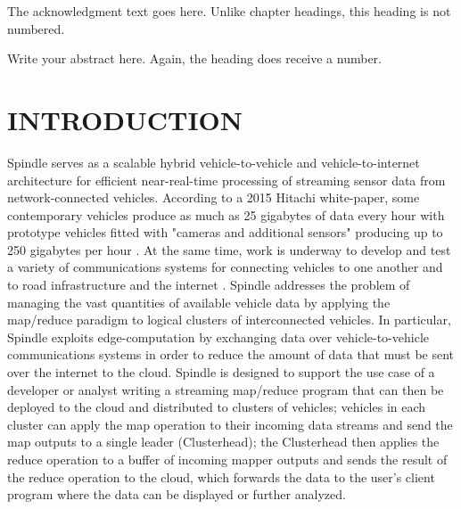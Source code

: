 \documentclass{thesis}
\author{William Rory Kronmiller}
\begin{document}
 
\titlepage             %
\tableofcontents       %
\listoftables          %
\listoffigures         %

The acknowledgment text goes here. Unlike chapter headings, 
this heading is not numbered.

Write your abstract here. Again, the heading does receive a number.

\chapter{INTRODUCTION}
    Spindle serves as a scalable hybrid vehicle-to-vehicle and vehicle-to-internet architecture
    for efficient near-real-time processing of streaming sensor data from network-connected vehicles.
    According to a 2015 Hitachi white-paper, some contemporary vehicles produce as much
    as 25 gigabytes of data every hour with prototype vehicles fitted with "cameras and additional
    sensors" producing up to 250 gigabytes per hour \cite{hitachi}. At the same time, work is underway
    to develop and test a variety of communications systems for connecting vehicles to one another
    and to road infrastructure and the internet \cite{connectivitypaper}. Spindle addresses the problem
    of managing the vast quantities of available vehicle data by applying the map/reduce \cite{mapreduce}
    paradigm to logical clusters of interconnected vehicles. In particular, Spindle exploits edge-computation
    by exchanging data over vehicle-to-vehicle communications systems in order to reduce the amount of data
    that must be sent over the internet to the cloud. Spindle is designed to support the use case
    of a developer or analyst writing a streaming map/reduce program that can then be deployed to the cloud
    and distributed to clusters of vehicles; vehicles in each cluster can apply the map operation to their
    incoming data streams and send the map outputs to a single leader (Clusterhead); the Clusterhead then
    applies the reduce operation to a buffer of incoming mapper outputs and sends the result of the reduce
    operation to the cloud, which forwards the data to the user's client program where the data can be
    displayed or further analyzed.
\end{document}
